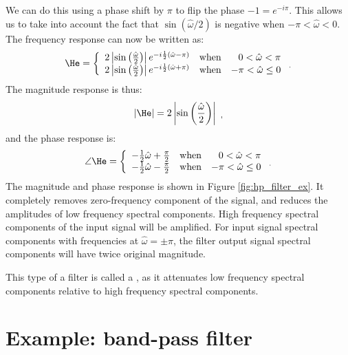 \noindent We can do this using a phase shift by $\pi$ to flip the phase $-1 = e^{-i\pi}$. This allows us to take into account the fact that $\sin(\hat{\omega}/2)$ is negative when $-\pi < \hat{\omega} < 0$. The frequency response can now be written as:
\begin{equation}
\He = \left\{ 
  \begin{array}{llr}
    2\left|\sin\left(\frac{\hat{\omega}}{2}\right)\right|
    e^{-i\frac{1}{2}(\hat{\omega}-\pi)} & \mathrm{when} & 0
    < \hat{\omega} < \pi \\
    2\left|\sin\left(\frac{\hat{\omega}}{2}\right)\right|
    e^{-i\frac{1}{2}(\hat{\omega}+\pi)} & \mathrm{when} & -\pi
    < \hat{\omega} \le 0 \end{array} \,\, _.
\right.
\end{equation}
The magnitude response is thus:
\begin{equation}
|\He|=2\left|\sin\left(\frac{\hat{\omega}}{2}\right)\right| \,\, _,
\end{equation} 
and the phase response is:
\begin{equation}
\angle \He = \left\{ 
  \begin{array}{lcr}
    -\frac{1}{2}\hat{\omega} + \frac{\pi}{2}  & \mathrm{when} & 0 < \hat{\omega} < \pi \\
    -\frac{1}{2}\hat{\omega} - \frac{\pi}{2}  & \mathrm{when} & -\pi < \hat{\omega} \le 0 \\
  \end{array} \,\, _.
\right.
\end{equation}
The magnitude and phase response is shown in
Figure \ref{fig:hp_filter_ex}. It completely removes zero-frequency
component of the signal, and reduces the amplitudes of low frequency
spectral components. High frequency spectral components of the input
signal will be amplified. For input signal spectral components with
frequencies at $\hat{\omega}=\pm \pi$, the filter output signal
spectral components will have twice original magnitude.

This type of a filter is called a \emph{}, as it attenuates low frequency spectral
components relative to high frequency spectral components.


\section{Example: band-pass filter}

